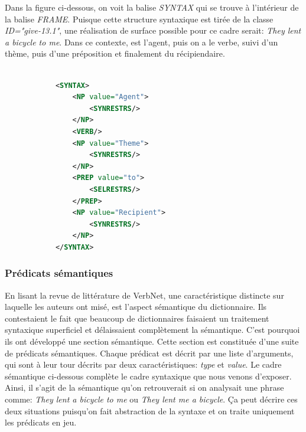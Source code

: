 Dans la figure ci-dessous, on voit la balise \emph{SYNTAX} qui se trouve à l'intérieur de la balise \emph{FRAME}. Puisque cette structure syntaxique est tirée de la classe \emph{ID="give-13.1"}, une réalisation de surface possible pour ce cadre serait: \emph{They lent a bicycle to me}. Dans ce contexte,  est l'agent, puis on a le verbe, suivi d'un thème, puis d'une préposition et finalement du récipiendaire.

\begin{lstlisting}[language=Xml, caption = cadres syntaxiques]

            <SYNTAX>
                <NP value="Agent">
                    <SYNRESTRS/>
                </NP>
                <VERB/>
                <NP value="Theme">
                    <SYNRESTRS/>
                </NP>
                <PREP value="to">
                    <SELRESTRS/>
                </PREP>
                <NP value="Recipient">
                    <SYNRESTRS/>
                </NP>
            </SYNTAX>
\end{lstlisting}

\subsubsection{Prédicats sémantiques}

En lisant la revue de littérature de VerbNet, une caractéristique distincte sur laquelle les auteurs ont misé, est l'aspect sémantique du dictionnaire. Ils contestaient le fait que beaucoup de dictionnaires faisaient un traitement syntaxique superficiel et délaissaient complètement la sémantique. C'est pourquoi ils ont développé une section sémantique. Cette section est constituée d'une suite de prédicats sémantiques. Chaque prédicat est décrit par une liste d'arguments, qui sont à leur tour décrits par deux caractéristiques: \emph{type} et \emph{value}.  Le cadre sémantique ci-dessous complète le cadre syntaxique que nous venons d'exposer. Ainsi, il s'agit de la sémantique qu'on retrouverait si on analysait une phrase comme: \emph{They lent a bicycle to me} ou \emph{They lent me a bicycle}. Ça peut décrire ces deux situations puisqu'on fait abstraction de la syntaxe et on traite uniquement les prédicats en jeu.

